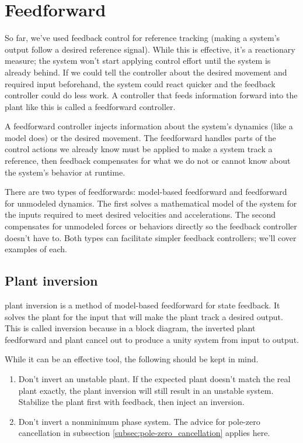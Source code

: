 \section{Feedforward}

So far, we've used feedback control for \gls{reference} \gls{tracking} (making a
\gls{system}'s output follow a desired \gls{reference} signal). While this is
effective, it's a reactionary measure; the \gls{system} won't start applying
\gls{control effort} until the \gls{system} is already behind. If we could tell
the \gls{controller} about the desired movement and required input beforehand,
the \gls{system} could react quicker and the feedback \gls{controller} could do
less work. A \gls{controller} that feeds information forward into the
\gls{plant} like this is called a \gls{feedforward controller}.

A \gls{feedforward controller} injects information about the \gls{system}'s
dynamics (like a \gls{model} does) or the desired movement. The feedforward
handles parts of the control actions we already know must be applied to make a
\gls{system} track a \gls{reference}, then feedback compensates for what we do
not or cannot know about the \gls{system}'s behavior at runtime.

There are two types of feedforwards: model-based feedforward and feedforward for
unmodeled dynamics. The first solves a mathematical model of the system for the
inputs required to meet desired velocities and accelerations. The second
compensates for unmodeled forces or behaviors directly so the feedback
controller doesn't have to. Both types can facilitate simpler feedback
controllers; we'll cover examples of each.

\subsection{Plant inversion}
\label{subsec:plant_inversion}

\Gls{plant} inversion is a method of model-based feedforward for \gls{state}
feedback. It solves the \gls{plant} for the input that will make the \gls{plant}
track a desired output. This is called inversion because in a block diagram, the
inverted \gls{plant} feedforward and \gls{plant} cancel out to produce a unity
system from input to output.

While it can be an effective tool, the following should be kept in mind.

\begin{enumerate}
  \item Don't invert an unstable \gls{plant}. If the expected \gls{plant}
    doesn't match the real \gls{plant} exactly, the \gls{plant} inversion will
    still result in an unstable \gls{system}. Stabilize the \gls{plant} first
    with feedback, then inject an inversion.
  \item Don't invert a nonminimum phase system. The advice for pole-zero
    cancellation in subsection \ref{subsec:pole-zero_cancellation} applies here.
\end{enumerate}

